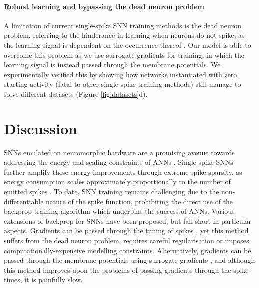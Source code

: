 \documentclass{article} \usepackage{iclr2023_conference,times}
\begin{document}
\paragraph{Robust learning and bypassing the dead neuron problem} A limitation of current single-spike SNN training methods is the dead neuron problem, referring to the hinderance in learning when neurons do not spike, as the learning signal is dependent on the occurrence thereof \citep{eshraghian2021training}. Our model is able to overcome this problem as we use surrogate gradients for training, in which the learning signal is instead passed through the membrane potentials. We experimentally verified this by showing how networks instantiated with zero starting activity (fatal to other single-spike training methods) still manage to solve different datasets (Figure \ref{fig:datasets}d).

\section{Discussion}
SNNs emulated on neuromorphic hardware are a promising avenue towards addressing the energy and scaling constraints of ANNs \citep{wunderlich2019demonstrating}. Single-spike SNNs further amplify these energy improvements through extreme spike sparsity, as energy consumption scales approximately proportionally to the number of emitted spikes \citep{panda2020toward}. To date, SNN training remains challenging due to the non-differentiable nature of the spike function, prohibiting the direct use of the backprop training algorithm which underpins the success of ANNs. Various extensions of backprop for SNNs have been proposed, but fall short in particular aspects. Gradients can be passed through the timing of spikes \citep{bohte2002error, mostafa2017supervised, kheradpisheh2020temporal}, yet this method suffers from the dead neuron problem, requires careful regularisation or imposes computationally-expensive modelling constraints. Alternatively, gradients can be passed through the membrane potentials using surrogate gradients \citep{shrestha2018slayer, neftci2019surrogate}, and although this method improves upon the problems of passing gradients through the spike times, it is painfully slow.
\end{document}
